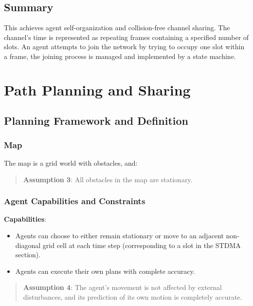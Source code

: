 \subsection{Summary}

This achieves agent self-organization and collision-free channel sharing. The channel's time is represented as repeating frames containing a specified number of slots. An agent attempts to join the network by trying to occupy one slot within a frame, the joining process is managed and implemented by a state machine.

\section{Path Planning and Sharing}


\subsection{Planning Framework and Definition}


\subsubsection{Map}
The map is a grid world with obstacles, and:
\begin{quotation}
    \textbf{Assumption 3}:
    All obstacles in the map are stationary.
\end{quotation}

\subsubsection{Agent Capabilities and Constraints}

\textbf{Capabilities}:
\begin{itemize}
    \item Agents can choose to either remain stationary or move to an adjacent non-diagonal grid cell at each time step (corresponding to a slot in the STDMA section).
    \item Agents can execute their own plans with complete accuracy.
\end{itemize}

\begin{quotation}
    \textbf{Assumption 4}: 
    The agent's movement is not affected by external disturbances, and its prediction of its own motion is completely accurate.
\end{quotation}

